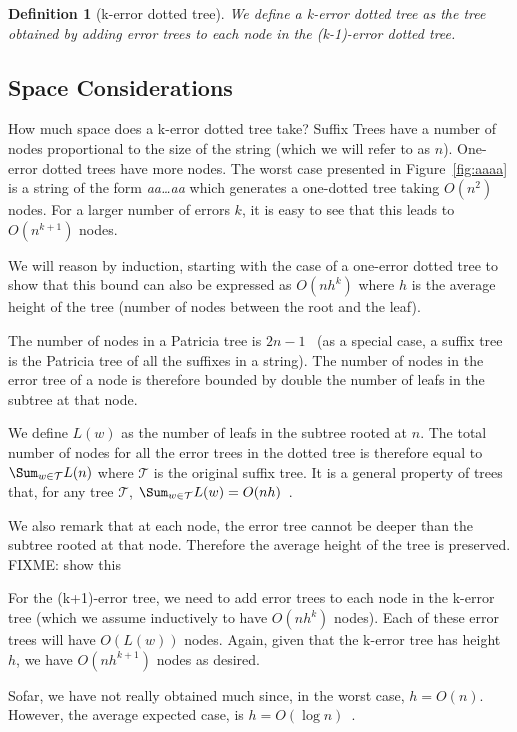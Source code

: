 \documentclass[a4paper,10pt]{article}
\newcommand{\putstring}[1]{\textsl{#1}}
\newtheorem{definition}{Definition}
\begin{document}
\begin{definition}[k-error dotted tree]
We define a k-error dotted tree as the tree obtained by adding error trees to each node in the (k-1)-error dotted tree.
\end{definition}

\subsection{Space Considerations}

How much space does a k-error dotted tree take? Suffix Trees have a number of nodes proportional to the size of the string (which we will refer to as $n$). One-error dotted trees have more nodes. The worst case presented in Figure~\ref{fig:aaaa} is a string of the form \putstring{aa\ldots{}aa} which generates a one-dotted tree taking $O(n^2)$ nodes. For a larger number of errors $k$, it is easy to see that this leads to $O(n^{k+1})$ nodes.

We will reason by induction, starting with the case of a one-error dotted tree to show that this bound can also be expressed as $O(nh^k)$ where $h$ is the average height of the tree (number of nodes between the root and the leaf).

The number of nodes in a Patricia tree is $2n-1$~\cite{patricia} (as a special case, a suffix tree is the Patricia tree of all the suffixes in a string). The number of nodes in the error tree of a node is therefore bounded by double the number of leafs in the subtree at that node.

We define $L(w)$ as the number of leafs in the subtree rooted at $n$. The total number of nodes for all the error trees in the dotted tree is therefore equal to $\Sum_{w \in \mathcal{T}}L(n)$ where $\mathcal{T}$ is the original suffix tree. It is a general property of trees that, for any tree $\mathcal{T}$, $\Sum_{w \in \mathcal{T}}L(w) = O(nh)$~\cite{whatever}.

We also remark that at each node, the error tree cannot be deeper than the subtree rooted at that node. Therefore the average height of the tree is preserved. FIXME: show this

For the (k+1)-error tree, we need to add error trees to each node in the k-error tree (which we assume inductively to have $O(nh^k)$ nodes). Each of these error trees will have $O(L(w))$ nodes. Again, given that the k-error tree has height $h$, we have $O(nh^{k+1})$ nodes as desired.

Sofar, we have not really obtained much since, in the worst case, $h=O(n)$. However, the average expected case, is $h=O(\log n)$~\cite{devroye:note,szpankowski:unexpected}.
\end{document}
